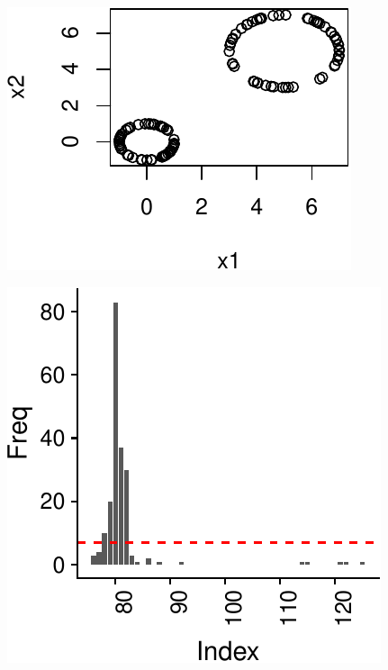 \documentclass[smallextended]{svjour3}       %
\begin{document}
\begin{center}\includegraphics{springer_template_files/figure-latex/unnamed-chunk-7-2} \end{center}

\begin{center}\includegraphics{springer_template_files/figure-latex/unnamed-chunk-7-3} \end{center}
\end{document}
